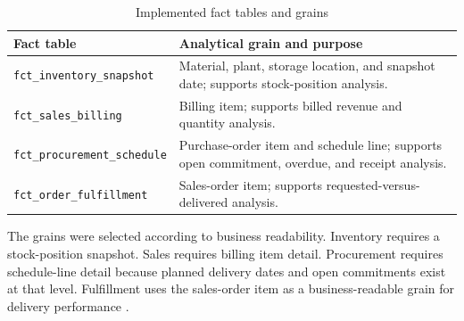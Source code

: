 \begin{table}[htbp]
\centering
\small
\caption{Implemented fact tables and grains}
\label{tab:fact-grains-condensed}
\begin{tabular}{p{} p{}}
\hline
\textbf{Fact table} & \textbf{Analytical grain and purpose} \\
\hline
\texttt{fct\_inventory\_snapshot} & Material, plant, storage location, and snapshot date; supports stock-position analysis. \\
\texttt{fct\_sales\_billing} & Billing item; supports billed revenue and quantity analysis. \\
\texttt{fct\_procurement\_schedule} & Purchase-order item and schedule line; supports open commitment, overdue, and receipt analysis. \\
\texttt{fct\_order\_fulfillment} & Sales-order item; supports requested-versus-delivered analysis. \\
\hline
\end{tabular}
\normalsize
\end{table}

The grains were selected according to business readability. Inventory requires a stock-position snapshot. Sales requires billing item detail. Procurement requires schedule-line detail because planned delivery dates and open commitments exist at that level. Fulfillment uses the sales-order item as a business-readable grain for delivery performance \parencite{takacs_data_2020}.

